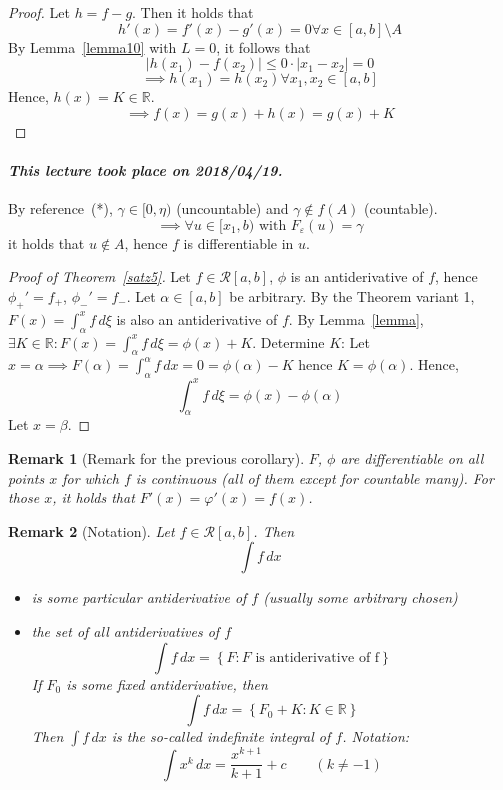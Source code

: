 \documentclass{article}
\newtheorem{remark}{Remark}  \numberwithin{remark}{section}
\newcommand{\set}[1]{\left\{#1\right\}}
\newcommand{\card}[1]{\left|#1\right|}
\newcommand{\dateref}[1]{\paragraph{\textit{This lecture took place on #1.}}}
\begin{document}
\begin{proof}
  Let $h = f - g$. Then it holds that
  \[ h'(x) = f'(x) - g'(x) = 0 \forall x \in [a,b] \setminus A \]
  By Lemma~\ref{lemma10} with $L = 0$, it follows that
  \[ \card{h(x_1) - f(x_2)} \leq 0 \cdot \card{x_1 - x_2} = 0 \]
  \[ \implies h(x_1) = h(x_2) \forall x_1, x_2 \in [a,b] \]
  Hence, $h(x) = K \in \mathbb R$.
  \[ \implies f(x) = g(x) + h(x) = g(x) + K \]
\end{proof}

\dateref{2018/04/19}

By reference~(*), $\gamma \in [0, \eta)$ (uncountable) and $\gamma \not\in f(A)$ (countable).
\[ \implies \forall u \in [x_1, b) \text{ with } F_{\varepsilon}(u) = \gamma \]
it holds that $u \not\in A$, hence $f$ is differentiable in $u$.

\begin{proof}[Proof of Theorem~\ref{satz5}]
  Let $f \in \mathcal R[a,b]$, $\phi$ is an antiderivative of $f$,
  hence $\phi_+' = f_+$, $\phi_-' = f_-$. Let $\alpha \in [a,b]$ be arbitrary.
  By the Theorem variant 1, $F(x) = \int_{\alpha}^x f \, d\xi$ is also an antiderivative of $f$.
  By Lemma~\ref{lemma}, $\exists K \in \mathbb R: F(x) = \int_{\alpha}^x f \, d\xi = \phi(x) + K$.
  Determine $K$: Let $x = \alpha \implies F(\alpha) = \int_\alpha^\alpha f \, dx = 0 = \phi(\alpha) - K$
  hence $K = \phi(\alpha)$. Hence,
  \[ \int_\alpha^x f \, d\xi = \phi(x) - \phi(\alpha) \]
  Let $x = \beta$.
\end{proof}

\begin{remark}[Remark for the previous corollary]
  $F$, $\phi$ are differentiable on all points $x$ for which $f$ is continuous
  (all of them except for countable many).
  For those $x$, it holds that $F'(x) = \varphi'(x) = f(x)$.
\end{remark}

\begin{remark}[Notation]
  Let $f \in \mathcal R[a,b]$. Then
  \[ \int f \, dx \]
  \begin{itemize}
    \item is some particular antiderivative of $f$ (usually some arbitrary chosen)
    \item the set of \emph{all} antiderivatives of $f$
      \[ \int f \, dx = \set{F: F \text{ is antiderivative of f}} \]
      If $F_0$ is some fixed antiderivative, then
      \[ \int f \, dx = \set{F_0 + K: K \in \mathbb R} \]
      Then $\int f \, dx$ is the so-called \emph{indefinite integral of $f$}.
      Notation:
      \[ \int x^k \, dx = \frac{x^{k+1}}{k+1} + c \qquad (k \neq -1) \]
  \end{itemize}
\end{remark}
\end{document}
